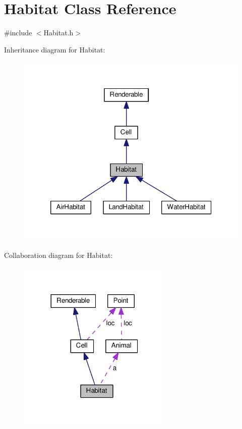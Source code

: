 \hypertarget{classHabitat}{}\section{Habitat Class Reference}
\label{classHabitat}


{\ttfamily \#include $<$Habitat.\+h$>$}



Inheritance diagram for Habitat\+:
\nopagebreak
\begin{figure}[H]
\begin{center}
\leavevmode
\includegraphics[width=320pt]{classHabitat__inherit__graph}
\end{center}
\end{figure}


Collaboration diagram for Habitat\+:
\nopagebreak
\begin{figure}[H]
\begin{center}
\leavevmode
\includegraphics[width=209pt]{classHabitat__coll__graph}
\end{center}
\end{figure}
